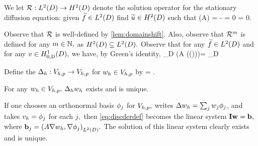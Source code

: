 We let $\DeltaAI:\LtD\rightarrow\HtD$ denote the solution operator for the stationary diffusion equation: given $\ftilde \in \LtD$ find $\utilde \in \HtD$ such that
\beq\label{eq:sdeq}
\grad \cdot \mleft(A\grad \utilde\mright) = -\ftilde
\eeq
\beq\label{eq:sddbc}
\trD \utilde = 0
\eeq
\beq\label{eq:sdnbc}
\dn \utilde = 0.
\eeq


Observe that $\mathcal R$ is well-defined by \cref{lem:domainshift}. Also, observe that $\mathcal R^{m}$ is defined for any $m \in \mathbb N,$ as $\HtD \subseteq \LtD.$
Observe that for any $\ftilde \in \LtD$ and for any $v \in \HozDD,$ we have, by Green's identity,
\beq\label{eq:deltaagreen}
\int_D \mleft(A \grad \mleft(\DeltaAI(\ftilde)\mright)\mright)\cdot \grad \vb = \int_D \ftilde \vb
\eeq

Define the  $\Delta_{h}:V_{h,p}\rightarrow V_{h,p}$ for $w_{h} \in V_{h,p}$ by
\beq\label{eq:discderdef}
\IPLtD{\Deltah \wh}{\vh} =  \tforall \vh \in \Vhp.
\eeq
\ede

\label{lem:ddwd}
For any $w_{h} \in V_{h,p},$ $\Delta_{h} w_{h}$ exists and is unique.
\ele

If one chooses an orthonormal basis $\phi_{j}$ for $V_{h,p},$ writes $\Delta w_{h} = \sum_j w_{j} \phi_{j}$, and takes $v_{h} = \phi_{j}$ for each $j,$ then \cref{eq:discderdef} becomes the linear system $\mathbf{I} \mathbf{w} = \mathbf{b},$ where $\bb_{j} = \IPLtD{A \grad \wh}{\grad \phij}.$ The solution of this linear system clearly exists and is unique.
\epf

